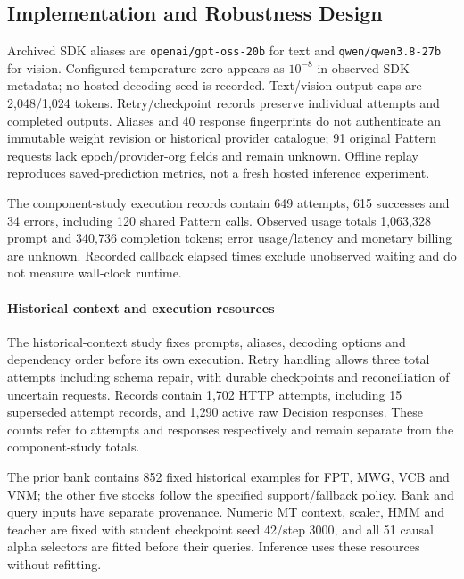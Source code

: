 \subsection{Implementation and Robustness Design}
Archived SDK aliases are \texttt{openai/gpt-oss-20b} for text and \texttt{qwen/qwen3.8-27b} for vision. Configured temperature zero appears as $10^{-8}$ in observed SDK metadata; no hosted decoding seed is recorded. Text/vision output caps are 2,048/1,024 tokens. Retry/checkpoint records preserve individual attempts and completed outputs. Aliases and 40 response fingerprints do not authenticate an immutable weight revision or historical provider catalogue; 91 original Pattern requests lack epoch/provider-org fields and remain unknown. Offline replay reproduces saved-prediction metrics, not a fresh hosted inference experiment.

The component-study execution records contain 649 attempts, 615 successes and 34 errors, including 120 shared Pattern calls. Observed usage totals 1,063,328 prompt and 340,736 completion tokens; error usage/latency and monetary billing are unknown. Recorded callback elapsed times exclude unobserved waiting and do not measure wall-clock runtime.

\paragraph{Historical context and execution resources}
The historical-context study fixes prompts, aliases, decoding options and dependency order before its own execution. Retry handling allows three total attempts including schema repair, with durable checkpoints and reconciliation of uncertain requests. Records contain 1,702 HTTP attempts, including 15 superseded attempt records, and 1,290 active raw Decision responses. These counts refer to attempts and responses respectively and remain separate from the component-study totals.

The prior bank contains 852 fixed historical examples for FPT, MWG, VCB and VNM; the other five stocks follow the specified support/fallback policy. Bank and query inputs have separate provenance. Numeric MT context, scaler, HMM and teacher are fixed with student checkpoint seed 42/step 3000, and all 51 causal alpha selectors are fitted before their queries. Inference uses these resources without refitting.
